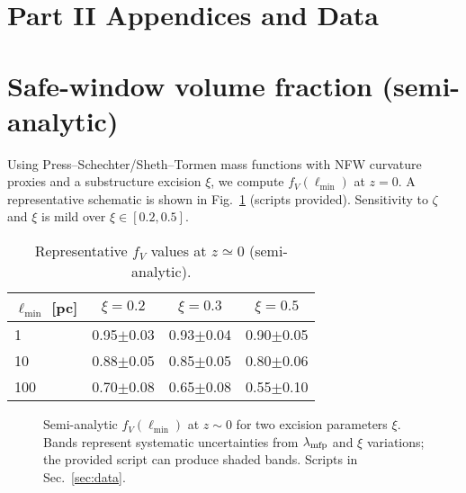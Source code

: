 \documentclass[aps,prd,onecolumn,superscriptaddress,nofootinbib]{revtex4-2}
\begin{document}
\section*{Part II Appendices and Data}

\section{Safe-window volume fraction (semi-analytic)}
\label{app:fv}
Using Press--Schechter/Sheth--Tormen mass functions with NFW curvature proxies and a substructure excision \(\xi\), we compute \(f_V(\ell_{\min})\) at \(z\!=\!0\). A representative schematic is shown in Fig.~\ref{fig:fV} (scripts provided). Sensitivity to \(\zeta\) and \(\xi\) is mild over \(\xi\in[0.2,0.5]\).

\begin{table}[b]
\centering
\caption{Representative \(f_V\) values at \(z\simeq 0\) (semi-analytic).}
\label{tab:fV}
\begin{tabular}{lccc}
\toprule
\(\ell_{\min}\) [pc] & \(\xi=0.2\) & \(\xi=0.3\) & \(\xi=0.5\) \\
\midrule
1   & 0.95\(\pm\)0.03 & 0.93\(\pm\)0.04 & 0.90\(\pm\)0.05 \\
10  & 0.88\(\pm\)0.05 & 0.85\(\pm\)0.05 & 0.80\(\pm\)0.06 \\
100 & 0.70\(\pm\)0.08 & 0.65\(\pm\)0.08 & 0.55\(\pm\)0.10 \\
\bottomrule
\end{tabular}
\end{table}

\begin{figure}[t]
\centering
{}
\caption{Semi-analytic \(f_V(\ell_{\min})\) at \(z\!\sim\!0\) for two excision parameters \(\xi\). Bands represent systematic uncertainties from \(\lambda_{\rm mfp}\) and \(\xi\) variations; the provided script can produce shaded bands. Scripts in Sec.~\ref{sec:data}.}
\label{fig:fV}
\end{figure}
\end{document}
